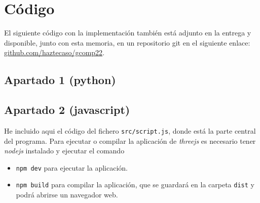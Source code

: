 \documentclass[10pt, spanish]{article}
\theoremstyle{definition}
\theoremstyle{break}
\begin{document}
\section{Código}
El siguiente código con la implementación también está adjunto en la entrega
y disponible, junto con esta memoria, en un repositorio git en el siguiente
enlace: \href{https://www.github.com/haztecaso/gcomp22}{github.com/haztecaso/gcomp22}.

\subsection{Apartado 1 (python)}



\subsection{Apartado 2 (javascript)}

He incluido aqui el código del fichero \texttt{src/script.js}, donde está la
parte central del programa. Para ejecutar o compilar la aplicación de
\textit{threejs} es necesario tener \textit{nodejs} instalado y ejecutar el comando

\begin{itemize}
    \item \texttt{npm dev} para ejecutar la aplicación.
    \item \texttt{npm build} para compilar la aplicación, que se guardará en la
        carpeta \texttt{dist} y podrá abrirse un navegador web.
\end{itemize}


\end{document}
